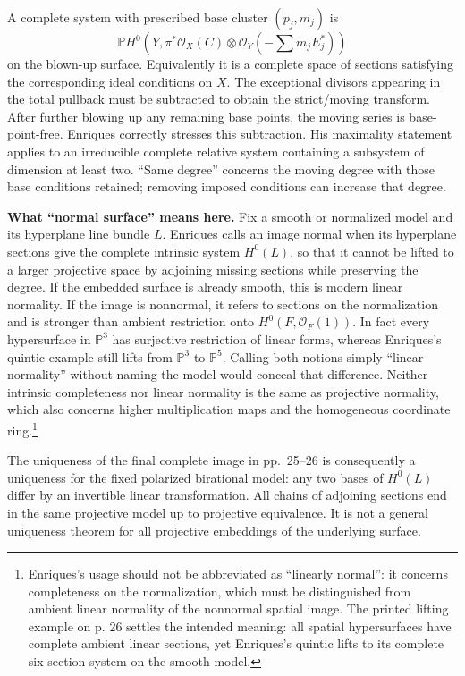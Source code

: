 A complete system with prescribed base cluster \((p_j,m_j)\) is \[
\mathbb P H^0\!\left(Y,\pi^*\mathcal O_X(C)
                 \otimes\mathcal O_Y(-\sum m_jE_j^*)\right)
\] on the blown-up surface. Equivalently it is a complete space of sections satisfying the corresponding ideal conditions on \(X\). The exceptional divisors appearing in the total pullback must be subtracted to obtain the strict/moving transform. After further blowing up any remaining base points, the moving series is base-point-free. Enriques correctly stresses this subtraction. His maximality statement applies to an irreducible complete relative system containing a subsystem of dimension at least two. ``Same degree'' concerns the moving degree with those base conditions retained; removing imposed conditions can increase that degree.

\textbf{What ``normal surface'' means here.} Fix a smooth or normalized model and its hyperplane line bundle \(L\). Enriques calls an image normal when its hyperplane sections give the complete intrinsic system \(H^0(L)\), so that it cannot be lifted to a larger projective space by adjoining missing sections while preserving the degree. If the embedded surface is already smooth, this is modern linear normality. If the image is nonnormal, it refers to sections on the normalization and is stronger than ambient restriction onto \(H^0(F,\mathcal O_F(1))\). In fact every hypersurface in \(\mathbb P^3\) has surjective restriction of linear forms, whereas Enriques's quintic example still lifts from \(\mathbb P^3\) to \(\mathbb P^5\). Calling both notions simply ``linear normality'' without naming the model would conceal that difference. Neither intrinsic completeness nor linear normality is the same as projective normality, which also concerns higher multiplication maps and the homogeneous coordinate ring.\footnote{Enriques's usage should not be abbreviated as ``linearly normal'': it concerns completeness on the normalization, which must be distinguished from ambient linear normality of the nonnormal spatial image. The printed lifting example on p. 26 settles the intended meaning: all spatial hypersurfaces have complete ambient linear sections, yet Enriques's quintic lifts to its complete six-section system on the smooth model.}

The uniqueness of the final complete image in pp.~25--26 is consequently a uniqueness for the fixed polarized birational model: any two bases of \(H^0(L)\) differ by an invertible linear transformation. All chains of adjoining sections end in the same projective model up to projective equivalence. It is not a general uniqueness theorem for all projective embeddings of the underlying surface.

